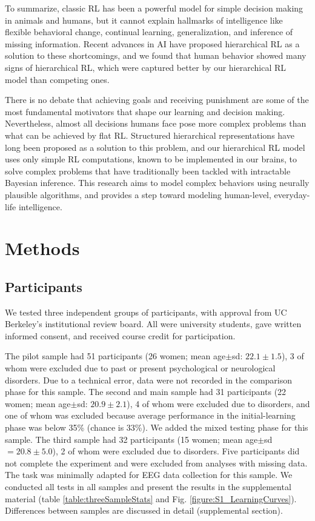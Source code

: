 \documentclass[10pt,letterpaper]{article}  %
\begin{document}
To summarize, classic RL has been a powerful model for simple decision making in animals and humans, but it cannot explain hallmarks of intelligence like flexible behavioral change, continual learning, generalization, and inference of missing information. Recent advances in AI have proposed hierarchical RL as a solution to these shortcomings, and we found that human behavior showed many signs of hierarchical RL, which were captured better by our hierarchical RL model than competing ones. %

There is no debate that achieving goals and receiving punishment are some of the most fundamental motivators that shape our learning and decision making. Nevertheless, almost all decisions humans face pose more complex problems than what can be achieved by flat RL. Structured hierarchical representations have long been proposed as a solution to this problem, and our hierarchical RL model uses only simple RL computations, known to be implemented in our brains, to solve complex problems that have traditionally been tackled with intractable Bayesian inference. This research aims to model complex behaviors using neurally plausible algorithms, and provides a step toward modeling human-level, everyday-life intelligence. 

\section*{Methods}

\subsection*{Participants}
We tested three independent groups of participants, with approval from UC Berkeley's institutional review board. All were university students, gave written informed consent, and received course credit for participation. 

The pilot sample had 51 participants (26 women; mean age$\pm$sd: $22.1\pm1.5$), 3 of whom were excluded due to past or present psychological or neurological disorders. Due to a technical error, data were not recorded in the comparison phase for this sample.
The second and main sample had 31 participants (22 women; mean age$\pm$sd: $20.9\pm2.1$), 4 of whom were excluded due to disorders, and one of whom was excluded because average performance in the initial-learning phase was below 35\% (chance is 33\%). We added the mixed testing phase for this sample. 
The third sample had 32 participants (15 women; mean age$\pm$sd $=20.8\pm5.0$), 2 of whom were excluded due to disorders. Five participants did not complete the experiment and were excluded from analyses with missing data. The task was minimally adapted for EEG data collection for this sample.
We conducted all tests in all samples and present the results in the supplemental material (table \ref{table:threeSampleStats} and Fig. \ref{figure:S1_LearningCurves}). Differences between samples are discussed in detail (supplemental section).
\end{document}
